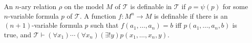 An $n$-ary relation $\rho$ on the model $M$ of $\mathcal{T}$ is definable in $\mathcal{T}$ if $\rho = \psi(p)$ for some $n$-variable formula $p$ of $\mathcal{T}$. A function $f: M^n \to M$ is definable if there is an $(n+1)$-variable formula $p$ such that $f(a_1, \ldots, a_n) = b$ iff $p(a_1, \ldots, a_n, b)$ is true, and $\mathcal{T} \vdash (\forall x_1)\cdots(\forall x_n)(\exists! y) p(x_1, \ldots, x_n, y)$.
